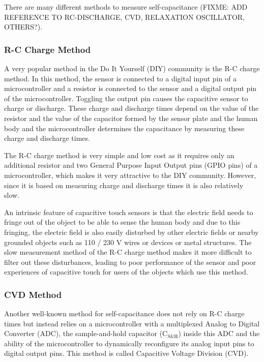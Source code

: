 \documentclass{sigchi-ext}
\begin{document}
There are many different methods to measure
self-capacitance (FIXME: ADD REFERENCE TO RC-DISCHARGE, CVD, RELAXATION
OSCILLATOR, OTHERS?). 

\subsubsection{R-C Charge Method}
A very popular method in the Do It Yourself (DIY) community is the R-C charge
method. In this method, the sensor is connected to a digital input pin of a
microcontroller and a resistor is connected to the sensor and a digital output
pin of the microcontroller. Toggling the output pin causes the capacitive sensor
to charge or discharge. These charge and discharge times depend on the value of
the resistor and the value of the capacitor formed by the sensor plate and the
human body and the microcontroller determines the capacitance by measuring these
charge and discharge times.

The R-C charge method is very simple and low cost as it requires only an
additional resistor and two General Purpose Input Output pins (GPIO pins) of a
microcontroller, which makes it very attractive to the DIY community.  However,
since it is based on measuring charge and discharge times it is also relatively
slow.

An intrinsic feature of capacitive touch sensors is that the
electric field needs to fringe out of the object to be able to sense the human
body and due to this fringing, the electric field is also easily disturbed by
other electric fields or nearby grounded objects such as 110 / 230 V wires or
devices or metal structures. The slow measurement method of the R-C charge
method makes it more difficult to filter out these disturbances, leading to poor
performance of the sensor and poor experiences of capacitive touch for users of
the objects which use this method.



\subsubsection{CVD Method}
Another well-known method for self-capacitance does not rely on R-C charge times
but instead relies on a microcontroller with a multiplexed Analog to Digital
Converter (ADC), the sample-and-hold capacitor ($\textrm{C}_{\textrm{S\&H}}$)
inside this ADC and the ability of the microcontroller to dynamically
reconfigure its analog input pins to digital output pins. This method is called
Capacitive Voltage Division (CVD).
\end{document}
